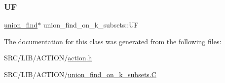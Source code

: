 \mbox{\label{classunion__find__on__k__subsets_a421a75e48a66d5ef546503a6d55110a8}} 
\subsubsection{\texorpdfstring{UF}{UF}}
{\footnotesize\ttfamily \mbox{\hyperlink{classunion__find}{union\+\_\+find}}$\ast$ union\+\_\+find\+\_\+on\+\_\+k\+\_\+subsets\+::\+UF}



The documentation for this class was generated from the following files\+:\begin{DoxyCompactItemize}
\item 
S\+R\+C/\+L\+I\+B/\+A\+C\+T\+I\+O\+N/\mbox{\hyperlink{action_8h}{action.\+h}}\item 
S\+R\+C/\+L\+I\+B/\+A\+C\+T\+I\+O\+N/\mbox{\hyperlink{union__find__on__k__subsets_8_c}{union\+\_\+find\+\_\+on\+\_\+k\+\_\+subsets.\+C}}\end{DoxyCompactItemize}
